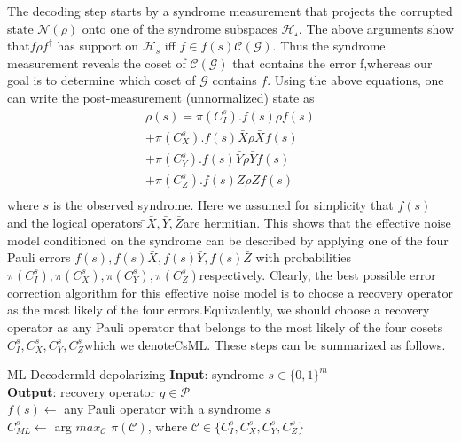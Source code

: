 The decoding step starts by a syndrome measurement that projects the corrupted state \(\mathcal{N}(\rho)\) onto one of the syndrome subspaces \(\mathcal{H_s}\). The above arguments show that\(f \rho f^{\dag}\) has  support  on \(\mathcal{H}_s\) iff \(f \in f(s)\mathcal{C}(\mathcal{G})\). Thus  the syndrome  measurement  reveals  the  coset  of \(\mathcal{C}(\mathcal{G})\) that contains the  error f,whereas  our  goal  is  to  determine which coset of \(\mathcal{G}\) contains \(f\). Using the above equations, one can write the post-measurement (unnormalized) state as
\begin{eqnarray*}
    \rho(s) = \pi(C_{I}^{s}) . f(s)\rho f(s)           \\
    + \pi(C_{X}^{s}) . f(s)\bar{X}\rho\bar{X} f(s) \\
    + \pi(C_{Y}^{s}) . f(s)\bar{Y}\rho\bar{Y} f(s) \\
    + \pi(C_{Z}^{s}) . f(s)\bar{Z}\rho\bar{Z} f(s) \\
\end{eqnarray*}
where \(s\) is the observed syndrome. Here we assumed for simplicity that \(f(s)\) and the logical operators ̄\(\bar{X}, \bar{Y}, \bar{Z}\)are hermitian. This shows that the effective noise model conditioned on the syndrome can be described by applying one of the four Pauli errors \(f(s), f(s)\bar{X}, f(s)\bar{Y}, f(s)\bar{Z}\) with probabilities \(\pi(C_I^{s}), \pi(C_X^{s}), \pi(C_Y^{s}), \pi(C_Z^{s})\)respectively. Clearly, the best possible error correction algorithm  for  this  effective  noise  model  is  to  choose  a recovery  operator  as  the  most  likely  of  the  four  errors.Equivalently,  we  should  choose  a  recovery  operator  as any Pauli operator that belongs to the most likely of the four cosets \(C_{I}^{s}, C_{X}^{s}, C_{Y}^{s}, C_{Z}^{s}\)which we denoteCsML.  These steps can be summarized as follows.

\begin{boxed-algo}{ML-Decoder}{mld-depolarizing}
\textbf{Input}: syndrome \(s \in \{0,1\}^m\) \\
\textbf{Output}: recovery operator \(g \in \mathcal{P}\) \\

\(f(s) \leftarrow\) any Pauli operator with a syndrome \(s\) \\
\(C_{ML}^{s} \leftarrow\) arg \(max_{\mathcal{C}}\) \(\pi(\mathcal{C})\), where \(\mathcal{C} \in \{C_{I}^{s}, C_{X}^{s}, C_{Y}^{s}, C_{Z}^{s}\}\)
\end{boxed-algo}

